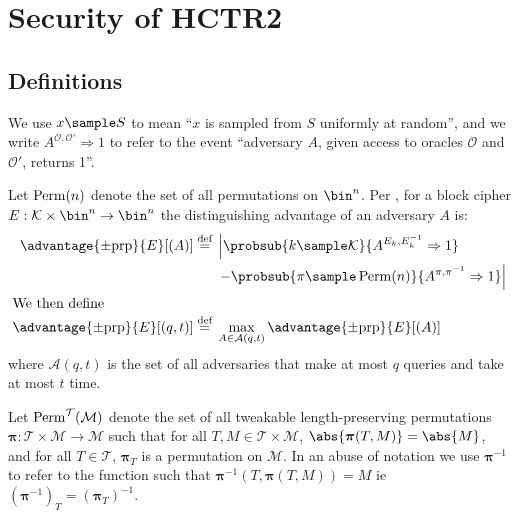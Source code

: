 \documentclass[hctr.tex]{subfiles}
\begin{document}
\section{Security of HCTR2}\label{security}
\subsection{Definitions}
We use \(x \sample S\) to mean ``\(x\) is sampled from \(S\)
uniformly at random'', and we write
\(A^{\mathcal{O}, \mathcal{O}'}\Rightarrow 1\) to refer
to the event ``adversary \(A\),
given access to oracles \(\mathcal{O}\) and \(\mathcal{O}'\),
returns 1''.

Let $\operatorname{Perm}(n)$ denote the set of all permutations on \(\bin^n\).
Per \cite{concrete}, for a block cipher 
\(E: \mathcal{K} \times \bin^n \rightarrow \bin^n\)
the distinguishing advantage of an adversary \(A\) is:
%
\begin{align*}
    \advantage{\pm \mathrm{prp}}{E}[(A)] \defeq
    {}&\left\lvert\probsub{k \sample \mathcal{K}}{A^{E_k,E_k^{-1}}\Rightarrow 1}\right.
    \\
    {}&\left. - \probsub{\pi \sample \Perm(n)}{A^{\pi,\pi^{-1}}\Rightarrow 1}\right\rvert
    \\
    \intertext{We then define}
    \advantage{\pm \mathrm{prp}}{E}[(q, t)] \defeq
    {}&\max_{A \in \mathcal{A}(q, t)} \advantage{\pm \mathrm{prp}}{E}[(A)]
\end{align*}
where $\mathcal{A}(q, t)$
is the set of all adversaries that make at most $q$ queries and take at most $t$ time.

Let $\operatorname{Perm}^\mathcal{T}(\mathcal{M})$
denote the set of all
tweakable length-preserving permutations
$\bm{\pi} : \mathcal{T} \times \mathcal{M} \rightarrow \mathcal{M}$
such that for all $T, M \in \mathcal{T} \times \mathcal{M}$,
$\abs{\bm{\pi}(T, M)} = \abs{M}$, and
for all $T \in \mathcal{T}$, $\bm{\pi}_{T}$ is a permutation on \(\mathcal{M}\).
In an abuse of notation
we use $\bm{\pi}^{-1}$ to refer to the function
such that $\bm{\pi}^{-1}(T, \bm{\pi}(T, M)) = M$ ie $(\bm{\pi}^{-1})_T = (\bm{\pi}_T)^{-1}$.
\end{document}
